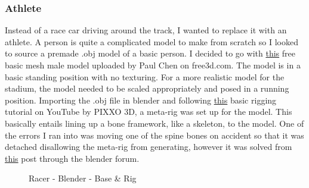\documentclass[a4 paper, 12pt]{article}
\begin{document}
\subsubsection{Athlete}
Instead of a race car driving around the track, I wanted to replace it with an athlete. A person is quite a complicated model to make from scratch so I looked to source a premade .obj model of a basic person. I decided to go with \href{https://free3d.com/3d-model/male-base-mesh-6682.html}{this} free basic mesh male model uploaded by Paul Chen on free3d.com. The model is in a basic standing position with no texturing. For a more realistic model for the stadium, the model needed to be scaled appropriately and posed in a running position. Importing the .obj file in blender and following \href{https://www.youtube.com/watch?v=XHa2Y8zjtZQ}{this} basic rigging tutorial on YouTube by PIXXO 3D, a meta-rig was set up for the model. This basically entails lining up a bone framework, like a skeleton, to the model. One of the errors I ran into was moving one of the spine bones on accident so that it was detached disallowing the meta-rig from generating, however it was solved from \href{https://blender.stackexchange.com/questions/169555/rigify-error-bone-cannot-connect-chain-bone}{this} post through the blender forum.
    \begin{figure} [H]
        \caption{Racer - Blender - Base \& Rig}   
    \end{figure}
\end{document}
